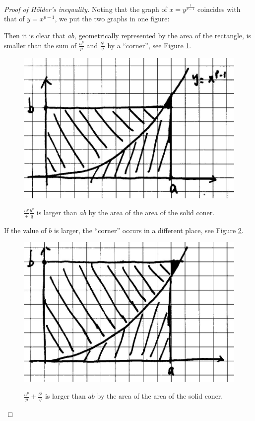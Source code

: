 \documentclass[a4paper,12pt]{article}
\newcommand{\Holder}{H\"{o}lder}
\theoremstyle{definition}
\theoremstyle{remark}
\begin{document}
\begin{proof}[Proof of \Holder's inequality]
  Noting that the graph of $x = y^{\frac{1}{p-1}}$ coincides with that of $y = x^{p-1}$, we put the two graphs in one figure:

  Then it is clear that $ab$, geometrically represented by the area of the rectangle, is smaller than the sum of $\frac{a^p}{p}$ and $\frac{b^q}{q}$ by a ``corner'', see Figure \ref{fig:small_b_value}.
  \begin{figure}[h]
    \centering
    \includegraphics{small_b_value}
    \label{fig:small_b_value}
    \caption{$\frac{a^p} + \frac{b^q}{q}$ is larger than $ab$ by the area of the area of the solid coner.}
  \end{figure}
  If the value of $b$ is larger, the ``corner'' occurs in a different place, see Figure \ref{fig:large_b_value}.
  \begin{figure}[h]
    \centering
    \includegraphics{large_b_value}
    \label{fig:large_b_value}
    \caption{$\frac{a^p}{p} + \frac{b^q}{q}$ is larger than $ab$ by the area of the area of the solid coner.}
  \end{figure}
  

\end{proof}
\end{document}
